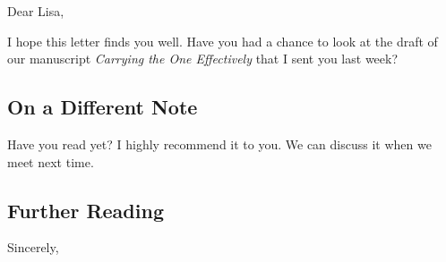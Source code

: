 \opening{Dear Lisa,}

I hope this letter finds you well.
Have you had a chance to look at the draft of our manuscript \emph{Carrying the One Effectively} that I sent you last week?


\subsection*{On a Different Note}

Have you read \cite{DetlefsenErlandsonHestonYoung:1976:1} yet?
I highly recommend it to you.
We can discuss it when we meet next time.


\subsection*{Further Reading}

\lipsum[1-2]

\closing{Sincerely,}
